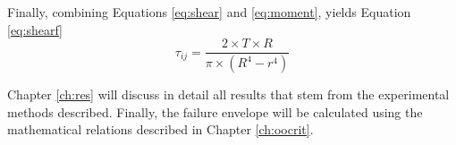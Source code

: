 \documentclass[main.tex]{subfiles}
\begin{document}
Finally, combining Equations \ref{eq:shear} and \ref{eq:moment}, yields Equation \ref{eq:shearf}
\begin{equation}\label{eq:shearf}
\tau_{ij}=\frac{2\times T \times R}{\pi\times(R^4-r^4)}  
\end{equation}


Chapter \ref{ch:res} will discuss in detail all results that stem from the experimental methods described. Finally, the failure envelope will be calculated using the mathematical relations described in Chapter \ref{ch:oocrit}.
% 
%

%
%
%
%
\end{document}
